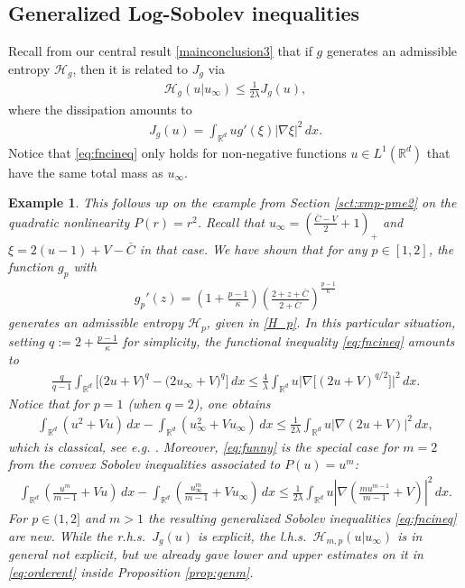 \documentclass[reqno]{amsart}
\newtheorem{example}[lemma]{Example}
\newcommand{\R}{\mathbb{R}}
\renewcommand{\H}{{\mathcal{H}}}
\begin{document}
\subsection{Generalized Log-Sobolev inequalities}
%
Recall from our central result \eqref{mainconclusion3} that if $g$ generates an admissible entropy $\mathcal H_g$, then it is related to $J_g$ via
\begin{align}
    \label{eq:fncineq}
    \mathcal H_g(u|u_\infty) \le \frac1{2\lambda} J_g(u),
\end{align}
where the dissipation amounts to 
\begin{align*}
    J_g(u) = \int_{\R^d}u g'(\xi) |\nabla\xi|^2\,dx.
\end{align*}
Notice that \eqref{eq:fncineq} only holds for non-negative functions $u\in L^1(\R^d)$ that have the same total mass as $u_\infty$.
%
\begin{example}
    This follows up on the example from Section \ref{sct:xmp-pme2} on the quadratic nonlinearity $P(r)=r^2$. Recall that $u_\infty=(\frac{\bar C-V}{2}+1)_+$ and $\xi=2(u-1)+V -\bar C$ in that case. We have shown that for any $p\in[1,2]$, the function $g_p$ with
    \begin{align*}
        g_p'(z) = \left(1+\frac{p-1}\kappa\right)\left(\frac{2+z+\bar C}{2+\bar C}\right)^{\frac{p-1}\kappa}
    \end{align*}
    generates an admissible entropy $\mathcal H_p$, given in \eqref{H_p}. In this particular situation, setting $q:=2+\frac{p-1}\kappa$ for simplicity, the functional inequality \eqref{eq:fncineq} amounts to
    \begin{align*}
         \frac q{q-1}\int_{\R^d}\big[\big(2u+V)^q-\big(2u_\infty+V)^q\big]\,dx 
        \le \frac{4}\lambda \int_{\R^d}u\big|\nabla\big[(2u+V)^{q/2}\big]\big|^2\,dx.
    \end{align*}
    Notice that for $p=1$ (when $q=2$), one obtains
    \begin{align}
        \label{eq:funny}
        \int_{\R^d}\left(u^2+Vu\right)\,dx  - \int_{\R^d}\left(u_\infty^2+Vu_\infty\right)\,dx 
        \le \frac1{2\lambda} \int_{\R^d}u \big|\nabla(2u+V)\big|^2\,dx,
    \end{align}
    which is classical, see e.g. \cite{CJMTU}. Moreover, \eqref{eq:funny} is the special case for $m=2$ from the convex Sobolev inequalities associated to $P(u)=u^m$: 
    \begin{align*}
        \int_{\R^d}\left(\frac{u^m}{m-1}+Vu\right)\,dx - \int_{\R^d}\left(\frac{u_\infty^m}{m-1}+Vu_\infty\right)\,dx
        \le \frac1{2\lambda} \int_{\R^d} u\left|\nabla\left(\frac{mu^{m-1}}{m-1}+V\right)\right|^2\,dx.
    \end{align*}    
    For $p\in(1,2]$ and $m>1$ the resulting generalized Sobolev inequalities \eqref{eq:fncineq} are new. While the r.h.s.\ $J_g(u)$ is explicit, the l.h.s.\ $\H_{m,p}(u|u_\infty)$ is in general not explicit, but we already gave lower and upper estimates on it in \eqref{eq:orderent} inside Proposition \ref{prop:genm}.
\end{example}
\end{document}
